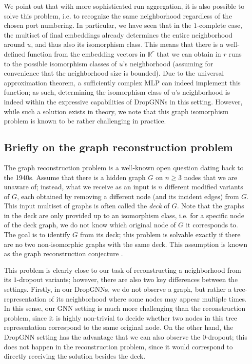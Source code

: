 \documentclass{article}
\begin{document}
We point out that with more sophisticated run aggregation, it is also possible to solve this problem, i.e. to recognize the same neighborhood regardless of the chosen port numbering. In particular, we have seen that in the $1$-complete case, the multiset of final embeddings already determines the entire neighborhood around $u$, and thus also its isomorphism class. This means that there is a well-defined function from the embedding vectors in $\mathbb{R}^r$ that we can obtain in $r$ runs to the possible isomorphism classes of $u$'s neighborhood (assuming for convenience that the neighborhood size is bounded). Due to the universal approximation theorem, a sufficiently complex MLP can indeed implement this function; as such, determining the isomorphism class of $u$'s neighborhood is indeed within the expressive capabilities of DropGNNs in this setting. However, while such a solution exists in theory, we note that this graph isomorphism problem is known to be rather challenging in practice.

\subsection{Briefly on the graph reconstruction problem}

The graph reconstruction problem is a well-known open question dating back to the 1940s. Assume that there is a hidden graph $G$ on $n \geq 3$ nodes that we are unaware of; instead, what we receive as an input is $n$ different modified variants of $G$, each obtained by removing a different node (and its incident edges) from $G$. This input multiset of graphs is often called the \textit{deck} of $G$. Note that the graphs in the deck are only provided up to an isomorphism class, i.e. for a specific node of the deck graph, we do not know which original node of $G$ it corresponds to. The goal is to identify $G$ from its deck; this problem is solvable exactly if there are no two non-isomorphic graphs with the same deck. This assumption is known as the graph reconstruction conjecture \citep{reconstruction}.

This problem is clearly close to our task of reconstructing a neighborhood from its $1$-dropout variants; however, there are also two key differences between the settings. Firstly, in our DropGNNs, we do not observe a graph, but rather a tree-representation of its neighborhood where some nodes may appear multiple times. In this sense, our GNN setting is much more challenging than the reconstruction problem, since it is highly non-trivial to decide whether two nodes in this tree representation correspond to the same original node. On the other hand, the DropGNN setting has the advantage that we can also observe the $0$-dropout; this does not happen in the reconstruction problem, since it would correspond to directly receiving the solution besides the deck.
\end{document}
